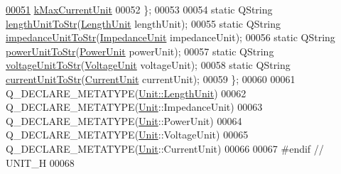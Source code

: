 \begin{DoxyCode}
\hypertarget{unit_8h_source_l00051}{}\hyperlink{class_unit_a0794cf6c9682f48296dd4a5315389787aeb1fd2a24bcda443e3c3d91c525134c8}{00051}     \hyperlink{class_unit_a0794cf6c9682f48296dd4a5315389787aeb1fd2a24bcda443e3c3d91c525134c8}{kMaxCurrentUnit}
00052   \};
00053 
00054   \textcolor{keyword}{static} QString \hyperlink{class_unit_abd363319f79f97b0a0b9a08c5ddc3cdb}{lengthUnitToStr}(\hyperlink{class_unit_a8c8921f7b225ad6063b1cb573425b9a0}{LengthUnit} lengthUnit);
00055   \textcolor{keyword}{static} QString \hyperlink{class_unit_ae3ca20f4b6530f04ca6aa138ec0fa7d2}{impedanceUnitToStr}(\hyperlink{class_unit_a3747e779c805df24a71961290be3fbdf}{ImpedanceUnit} impedanceUnit);
00056   \textcolor{keyword}{static} QString \hyperlink{class_unit_ad1487441b5a7eb93a3eb0aeebe947725}{powerUnitToStr}(\hyperlink{class_unit_ace265ae255370ccacfd5370337572c3b}{PowerUnit} powerUnit);
00057   \textcolor{keyword}{static} QString \hyperlink{class_unit_a7fa103c31f9f069961b35b6371ff0c0a}{voltageUnitToStr}(\hyperlink{class_unit_a55b07dfa9457e1eca2c7194fe0cfc3c1}{VoltageUnit} voltageUnit);
00058   \textcolor{keyword}{static} QString \hyperlink{class_unit_a7bd3ed3edcb18170cd162d384075b651}{currentUnitToStr}(\hyperlink{class_unit_a0794cf6c9682f48296dd4a5315389787}{CurrentUnit} currentUnit);
00059 \};
00060 
00061 Q\_DECLARE\_METATYPE(\hyperlink{class_unit_a8c8921f7b225ad6063b1cb573425b9a0}{Unit::LengthUnit})
00062 Q\_DECLARE\_METATYPE(\hyperlink{class_unit}{Unit}::ImpedanceUnit)
00063 Q\_DECLARE\_METATYPE(\hyperlink{class_unit}{Unit}::PowerUnit)
00064 Q\_DECLARE\_METATYPE(\hyperlink{class_unit}{Unit}::VoltageUnit)
00065 Q\_DECLARE\_METATYPE(\hyperlink{class_unit}{Unit}::CurrentUnit)
00066 
00067 \textcolor{preprocessor}{#endif // UNIT\_H}
00068 
\end{DoxyCode}
